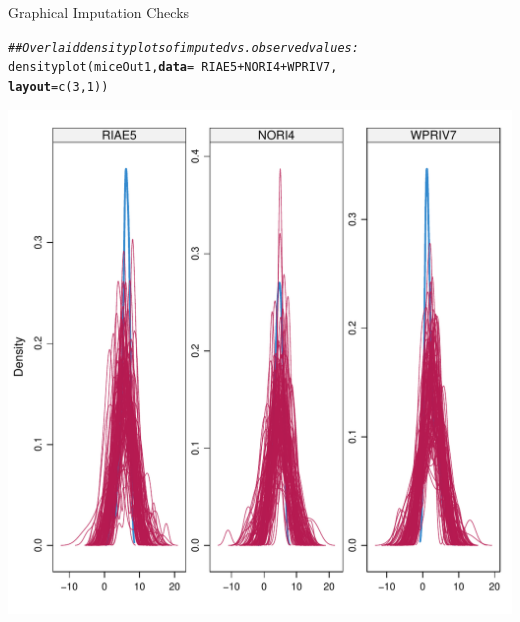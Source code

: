 \documentclass{beamer}\usepackage[]{graphicx}\usepackage[]{color}
\makeatletter
\newcommand{\hlnum}[1]{\textcolor[rgb]{0.69,0.494,0}{#1}}%
\newcommand{\hlcom}[1]{\textcolor[rgb]{0.514,0.506,0.514}{\textit{#1}}}%
\newcommand{\hlopt}[1]{\textcolor[rgb]{0,0,0}{#1}}%
\newcommand{\hlstd}[1]{\textcolor[rgb]{0,0,0}{#1}}%
\newcommand{\hlkwc}[1]{\textcolor[rgb]{0,0,0}{\textbf{#1}}}%
\newcommand{\hlkwd}[1]{\textcolor[rgb]{0.004,0.004,0.506}{#1}}%
\newenvironment{kframe}{%
 \def\at@end@of@kframe{}%
 \ifinner\ifhmode%
  \def\at@end@of@kframe{\end{minipage}}%
  \begin{minipage}{\columnwidth}%
 \fi\fi%
 \def\FrameCommand##1{\hskip\@totalleftmargin \hskip-\fboxsep
 \colorbox{shadecolor}{##1}\hskip-\fboxsep
     \hskip-\linewidth \hskip-\@totalleftmargin \hskip\columnwidth}%
 \MakeFramed {\advance\hsize-\width
   \@totalleftmargin\z@ \linewidth\hsize
   \@setminipage}}%
 {\par\unskip\endMakeFramed%
 \at@end@of@kframe}
\newenvironment{knitrout}{}{} %
\makeatother
\begin{document}
\begin{frame}[fragile]{Graphical Imputation Checks}

\begin{knitrout}\scriptsize
{}\color{fgcolor}\begin{kframe}
\begin{alltt}
\hlcom{## Overlaid density plots of imputed vs. observed values:}
\hlkwd{densityplot}\hlstd{(miceOut1,} \hlkwc{data} \hlstd{=} \hlopt{~}\hlstd{RIAE5} \hlopt{+} \hlstd{NORI4} \hlopt{+} \hlstd{WPRIV7,}
            \hlkwc{layout} \hlstd{=} \hlkwd{c}\hlstd{(}\hlnum{3}\hlstd{,} \hlnum{1}\hlstd{))}
\end{alltt}
\end{kframe}

{\centering \includegraphics[width=0.65\linewidth,height=0.65\textheight]{figure/unnamed-chunk-11-1} 

}



\end{knitrout}
     
\end{frame}

\end{document}
